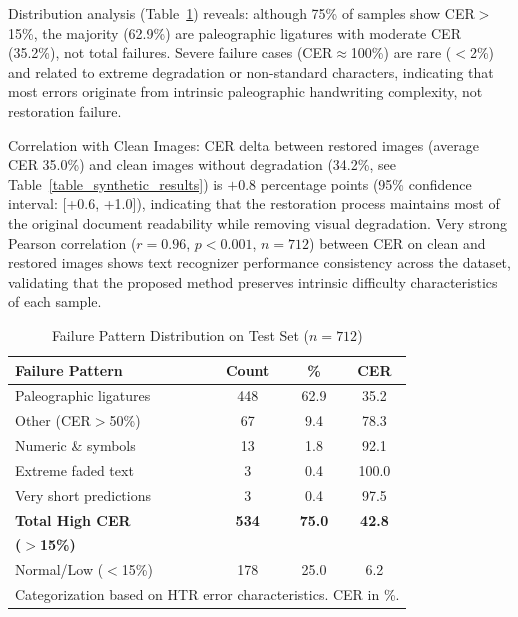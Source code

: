 \documentclass[journal]{IEEEtran}
\begin{document}
Distribution analysis (Table~\ref{table_failure_distribution}) reveals: although 75\% of samples show CER$>$15\%, the majority (62.9\%) are paleographic ligatures with moderate CER (35.2\%), not total failures. Severe failure cases (CER$\approx$100\%) are rare ($<$2\%) and related to extreme degradation or non-standard characters, indicating that most errors originate from intrinsic paleographic handwriting complexity, not restoration failure.

Correlation with Clean Images:
CER delta between restored images (average CER 35.0\%) and clean images without degradation (34.2\%, see Table~\ref{table_synthetic_results}) is $+0.8$ percentage points (95\% confidence interval: [+0.6, +1.0]), indicating that the restoration process maintains most of the original document readability while removing visual degradation. Very strong Pearson correlation ($r = 0.96$, $p<0.001$, $n=712$) between CER on clean and restored images shows text recognizer performance consistency across the dataset, validating that the proposed method preserves intrinsic difficulty characteristics of each sample.

\begin{table}[!t]
\renewcommand{\arraystretch}{1.15}
\caption{Failure Pattern Distribution on Test Set ($n=712$)}
\label{table_failure_distribution}
\centering
\footnotesize
\begin{tabularx}{\columnwidth}{|X|c|c|c|}
\hline
\textbf{Failure Pattern} & \textbf{Count} & \textbf{\%} & \textbf{CER} \\
\hline
Paleographic ligatures & 448 & 62.9 & 35.2 \\
Other (CER$>$50\%) & 67 & 9.4 & 78.3 \\
Numeric \& symbols & 13 & 1.8 & 92.1 \\
Extreme faded text & 3 & 0.4 & 100.0 \\
Very short predictions & 3 & 0.4 & 97.5 \\
\hline
\textbf{Total High CER} & \textbf{534} & \textbf{75.0} & \textbf{42.8} \\
\textbf{($>$15\%)} & & & \\
Normal/Low ($<$15\%) & 178 & 25.0 & 6.2 \\
\hline
\multicolumn{4}{|X|}{\scriptsize Categorization based on HTR error characteristics. CER in \%.} \\
\hline
\end{tabularx}
\end{table}
\end{document}
